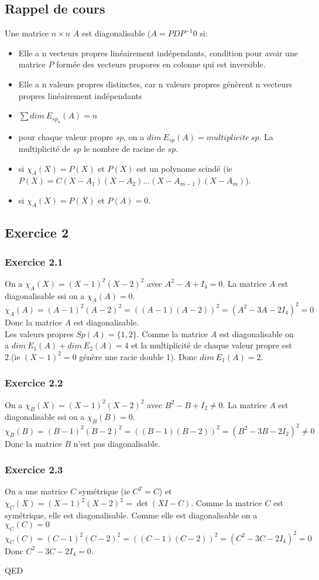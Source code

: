 \documentclass[]{book}
\theoremstyle{definition}
\begin{document}
\subsection*{Rappel de cours}
Une matrice $n \times n$ $A$ est diagonalisable ($A = PDP^{-1}$0 si:
\begin{itemize}
\item Elle a n vecteurs propres lin\'eairement ind\'ependants, condition pour avoir une matrice $P$ form\'ee des vecteurs propores en colonne qui est inversible. 
\item Elle a n valeurs propres distinctes, car n valeurs propres g\'en\`erent n vecteurs propres lin\'eairement ind\'ependants
\item $\sum{dim\ E_{sp_n}(A)} = n$
\item pour chaque valeur propre $sp$, on a $dim\ E_{sp}(A) = multiplicite\ sp$. La multiplicit\'e de $sp$ le nombre de racine de $sp$.
\item si $\chi_{A}(X) = P(X)$ et $P(X)$ est un polynome scind\'e (ie $P(X) = C(X-A_1)(X-A_2)\ldots(X-A_{m-1})(X-A_m)$).
\item si $\chi_{A}(X) = P(X)$ et $P(A)=0$.
\end{itemize}


\newpage
\subsection*{Exercice 2}
\subsubsection*{Exercice 2.1}
On a $\chi_{A}(X) = (X-1)^2(X-2)^2$ avec $A^2-A+I_4 = 0$. La matrice $A$ est diagonalisable ssi on a $\chi_{A}(A) = 0$.
$$\chi_{A}(A) = (A-1)^2(A-2)^2 = ((A-1)(A-2))^2=(A^2-3A-2I_4)^2 = 0$$
Donc la matrice $A$ est diagonalisable.\\
Les valeurs propres $Sp(A)=\{1,2\}$. Comme la matrice $A$ est diagonalisable on a $dim\ E_1(A) + dim\ E_2(A) = 4$ et la multiplicit\'e de chaque valeur propre est 2.(ie $(X-1)^2 = 0$ g\'en\`ere une racie double 1). Donc $dim\ E_1(A)=2$.


\subsubsection*{Exercice 2.2}
On a $\chi_{B}(X) = (X-1)^2(X-2)^2$ avec $B^2-B+I_2 \neq 0$. La matrice $A$ est diagonalisable ssi on a $\chi_{B}(B) = 0$.
$$\chi_{B}(B) = (B-1)^2(B-2)^2 = ((B-1)(B-2))^2=(B^2-3B-2I_2)^2 \neq 0$$
Donc la matrice $B$ n'est pas diagonalisable.\\

\subsubsection*{Exercice 2.3}
On a une matrice $C$ sym\'etrique (ie $C^T = C$) et $\chi_{C}(X) = (X-1)^2(X-2)^2 = \det(XI-C)$. Comme la matrice $C$ est sym\'etrique, elle est diagonalisable. Comme elle est diagonalisable on a $\chi_{C}(C) = 0$
$$\chi_{C}(C) = (C-1)^2(C-2)^2 = ((C-1)(C-2))^2=(C^2-3C-2I_4)^2 = 0$$
Donc $C^2-3C-2I_4 = 0$.

QED
\end{document}
